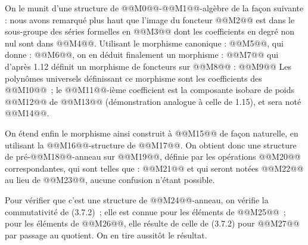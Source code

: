 
On le
munit d'une structure de @@M0@@-@@M1@@-algèbre de la façon suivante : nous avons remarqué plus haut que l'image du foncteur @@M2@@ est dans le sous-groupe des séries formelles en @@M3@@ dont les coefficients en degré non nul sont dans @@M4@@. Utilisant le morphisme canonique : @@M5@@, qui donne : @@M6@@, on en déduit finalement un morphisme :
@@M7@@
qui d'après 1.12 définit un morphisme de foncteurs sur @@M8@@ :
@@M9@@
Les polynômes universels définissant ce morphisme sont les coefficients des @@M10@@~; le @@M11@@-ième coefficient est la composante isobare de poids @@M12@@ de @@M13@@ (démonstration analogue à celle de 1.15), et sera noté @@M14@@.

On étend enfin le morphisme ainsi construit à @@M15@@ de façon naturelle, en utilisant la @@M16@@-structure de @@M17@@. On obtient donc une structure de pré-@@M18@@-anneau sur @@M19@@, définie par les opérations @@M20@@ correspondantes, qui sont telles que :
@@M21@@
et qui seront notées @@M22@@ au lieu de @@M23@@, aucune confusion n'étant possible.

Pour vérifier que c'est une structure de @@M24@@-anneau, on vérifie la commutativité de (3.7.2)~; elle est connue pour les éléments de @@M25@@~; pour les éléments de @@M26@@, elle résulte de celle de (3.7.2) pour @@M27@@ par passage au quotient. On en tire aussitôt le résultat.



\providecommand{\Ghat}{\widehat G}
\providecommand{\Aqhat}{\widehat A_{\mathbb Q}}
\providecommand{\Ch}{\operatorname{Ch}}
\providecommand{\Log}{\operatorname{Log}}
\renewcommand{\id}{\operatorname{id}}
\providecommand{\gr}{\operatorname{gr}}
\providecommand{\Hom}{\operatorname{Hom}}
\providecommand{\epsi}{\varepsilon}
\providecommand{\clgr}{\operatorname{cl}}
\providecommand{\Fil}{\operatorname{Fil}}
\providecommand{\Gr}{\operatorname{Gr}}
\providecommand{\Sym}{\operatorname{Sym}}


